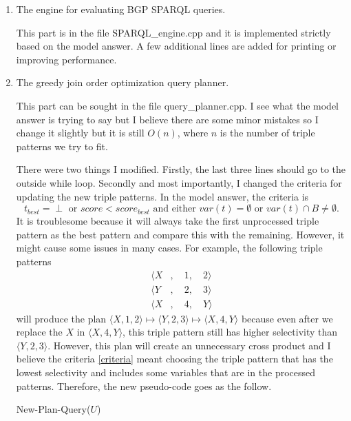 \documentclass{article}
\begin{document}
\begin{enumerate}
\begin{enumerate}
\item The engine for evaluating BGP SPARQL queries.

This part is in the file SPARQL\_engine.cpp and it is implemented strictly based on the model answer. A few additional lines are added for printing or improving performance.

\item The greedy join order optimization query planner.

This part can be sought in the file query\_planner.cpp. I see what the model answer is trying to say but I believe there are some minor mistakes so I change it slightly but it is still $O(n)$, where $n$ is the number of triple patterns we try to fit. 

There were two things I modified. Firstly, the last three lines should go to the outside while loop. Secondly and most importantly, I changed the criteria for updating the new triple patterns. In the model answer, the criteria is 
\begin{equation}\label{criteria}
	t_{best} = \perp \text{ or } score < score_{best} \text{ and either } var(t) = \emptyset \text{ or } var(t) \cap B \neq \emptyset.
\end{equation}
It is troublesome because it will always take the first unprocessed triple pattern as the best pattern and compare this with the remaining. However, it might cause some issues in many cases. For example, the following triple patterns 
\begin{align*}
	\langle X &,\quad 1,\quad 2\rangle \\
	\langle Y &,\quad 2,\quad 3\rangle\\
	\langle X &,\quad 4,\quad Y\rangle
\end{align*}
will produce the plan $\langle X, 1, 2\rangle \mapsto \langle Y, 2, 3\rangle \mapsto \langle X, 4, Y\rangle$ because even after we replace the $X$ in $\langle X, 4, Y\rangle$, this triple pattern still has higher selectivity than $\langle Y, 2, 3\rangle$. However, this plan will create an unnecessary cross product and I believe the criteria \eqref{criteria} meant choosing the triple pattern that has the lowest selectivity and includes some variables that are in the  processed patterns. Therefore, the new pseudo-code goes as the follow. 

\begin{algorithm}[H]
\caption{New-Plan-Query($U$)}\label{alg:greedy}
\begin{algorithmic}


\end{algorithmic}
\end{algorithm}
\end{enumerate}
\end{enumerate}
\end{document}
